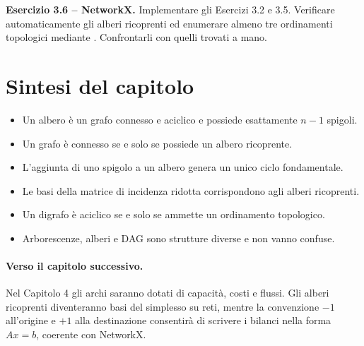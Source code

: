 \documentclass[11pt,a4paper]{article}
\begin{document}
\medskip
\textbf{Esercizio 3.6 -- NetworkX.}
Implementare gli Esercizi 3.2 e 3.5. Verificare automaticamente gli alberi ricoprenti ed enumerare almeno tre ordinamenti topologici mediante
. Confrontarli con quelli trovati a mano.

\section{Sintesi del capitolo}

\begin{learningbox}
\begin{itemize}[nosep]
\item Un albero è un grafo connesso e aciclico e possiede esattamente $n-1$ spigoli.
\item Un grafo è connesso se e solo se possiede un albero ricoprente.
\item L'aggiunta di uno spigolo a un albero genera un unico ciclo fondamentale.
\item Le basi della matrice di incidenza ridotta corrispondono agli alberi ricoprenti.
\item Un digrafo è aciclico se e solo se ammette un ordinamento topologico.
\item Arborescenze, alberi e DAG sono strutture diverse e non vanno confuse.
\end{itemize}
\end{learningbox}

\paragraph{Verso il capitolo successivo.}
Nel Capitolo 4 gli archi saranno dotati di capacità, costi e flussi. Gli alberi ricoprenti diventeranno basi del simplesso su reti, mentre la convenzione $-1$ all'origine e $+1$ alla destinazione consentirà di scrivere i bilanci nella forma $Ax=b$, coerente con NetworkX.
\end{document}
